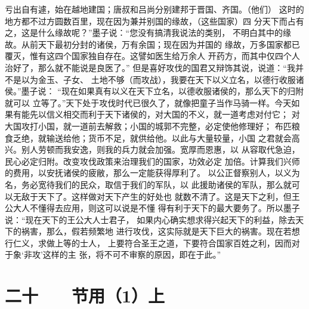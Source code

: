 \documentclass[12pt,UTF8]{ctexbook}
\begin{document}
亏出自有遽，始在越地建国；唐叔和吕尚分别建邦于晋国、齐国。（他们） 
这时的地方都不过方圆数百里，现在因为兼并别国的缘故，（这些国家）四 
分天下而占有之，这是什么缘故呢？”墨子说：“您没有搞清我说法的类别， 
不明白其中的缘故。从前天下最初分封的诸侯，万有余国；现在因为并国的 
缘故，万多国家都已覆灭，惟有这四个国家独自存在。这譬如医生给万余人 
开药方，而其中仅四个人治好了，那么就不能说是良医了。” 
但是喜好攻伐的国君又辩饰其说，说道：“我并不是以为金玉、子女、 
土地不够（而攻战），我要在天下以义立名，以德行收服诸侯。”墨子说： 
“现在如果真有以义在天下立名，以德收服诸侯的，那么天下的归附就可以 
立等了。”天下处于攻伐时代已很久了，就像把童子当作马骑一样。今天如 
果有能先以信义相交而利于天下诸侯的，对大国的不义，就一道考虑对付它； 
对大国攻打小国，就一道前去解救；小国的城郭不完整，必定使他修理好； 
布匹粮食乏绝，就输送给他；货币不足，就供给他。以此与大量较量，小国 
之君就会高兴。别人劳顿而我安逸，则我的兵力就会加强。宽厚而恩惠，以 
从容取代急迫，民心必定归附。改变攻伐政策来治理我们的国家，功效必定 
加倍。计算我们兴师的费用，以安抚诸侯的疲敝，那么一定能获得厚利了。 
以公正督察别人，以义为名，务必宽待我们的民众，取信于我们的军队，以 
此援助诸侯的军队，那么就可以无敌于天下了。这样做对天下产生的好处也 
就数不清了。这是天下之利，但王公大人不懂得去应用，则这可以说是不懂 
得有利于天下的最大要务了。所以墨子说：“现在天下的王公大人士君子， 
如果内心确实想求得兴起天下的利益，除去天下的祸害，那么，假若频繁地 
进行攻伐，这实际就是天下巨大的祸害。现在若想行仁义，求做上等的士人， 
上要符合圣王之道，下要符合国家百姓之利，因而对于象‘非攻’这样的主 
张，将不可不审察的原因，即在于此。” 

\chapter{二十　　节用（1）上}
\end{document}
